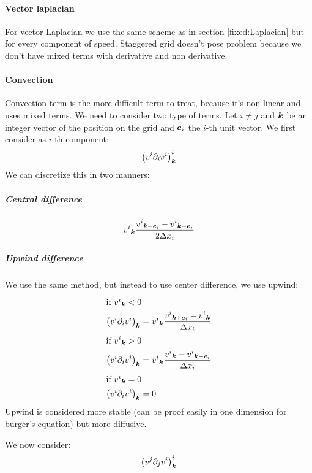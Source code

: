 \paragraph{Vector laplacian}
\label{fixed:vect:laplacian}
For vector Laplacian we use the same scheme as in section \ref{fixed:Laplacian} but for every component of speed.
Staggered grid doesn't pose problem because we don't have mixed terms with derivative and non derivative.

\paragraph{Convection}

Convection term is the more difficult term to treat, because it's non linear and uses mixed terms.
We need to consider two type of terms. Let $i\neq j$ and ${\boldsymbol {k}}$ be an integer vector of the position on the grid
and ${\boldsymbol {e}}_i$ the $i$-th unit vector.
We first consider as $i$-th component:
\begin{equation}
\left(v^{i}\partial_{i}v^{i}\right)^{i}_{{\boldsymbol {k}}}
\end{equation}
We can discretize this in two manners:

\subparagraph{Central difference}
\begin{equation}
{v^{i}}_{{\boldsymbol {k}}}\frac{{v^{i}}_{{\boldsymbol {k}}+{\boldsymbol {e}}_i}-{v^{i}}_{{\boldsymbol {k}}-{\boldsymbol {e}}_i}}{2\Delta x_{i}}
\end{equation}

\subparagraph{Upwind difference}
\label{fixed:upwind}

We use the same method, but instead to use center difference, we use upwind:
\begin{align}
\intertext{if ${v^{i}}_{{\boldsymbol {k}}}<0$}
\left(v^{i}\partial_{i}v^{i}\right)_{{\boldsymbol {k}}}&={v^{i}}_{{\boldsymbol {k}}}\frac{{v^{i}}_{{\boldsymbol {k}}+{\boldsymbol {e}}_i}-{v^{i}}_{{\boldsymbol {k}}}}{\Delta x_{i}}\\
\intertext{if ${v^{i}}_{{\boldsymbol {k}}}>0$}
\left(v^{i}\partial_{i}v^{i}\right)_{{\boldsymbol {k}}}&={v^{i}}_{{\boldsymbol {k}}}\frac{{v^{i}}_{{\boldsymbol {k}}}-{v^{i}}_{{\boldsymbol {k}}-{\boldsymbol {e}}_i}}{\Delta x_{i}}\\
\intertext{if ${v^{i}}_{{\boldsymbol {k}}}=0$}
\left(v^{i}\partial_{i}v^{i}\right)_{{\boldsymbol {k}}}&=0
\end{align}
Upwind is considered more stable (can be proof easily in one dimension for burger's equation) but more diffusive.

We now consider:
\begin{equation}
\left(v^{j}\partial_{j}v^{i}\right)^{i}_{{\boldsymbol {k}}}
\end{equation}

